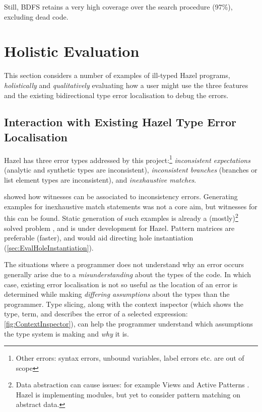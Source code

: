 Still, BDFS retains a very high coverage over the search procedure (97\%), excluding dead code.

\section{Holistic Evaluation}
\label{sec:HolisticEvaluation}

This section considers a number of examples of ill-typed Hazel programs, \textit{holistically} and \textit{qualitatively} evaluating how a user might use the three features and the existing bidirectional type error localisation \cite{MarkedLocalisation} to debug the errors. 


\subsection{Interaction with Existing Hazel Type Error Localisation}
Hazel has three error types addressed by this project:\footnote{Other errors: syntax errors, unbound variables, label errors etc. are out of scope} \textit{inconsistent expectations} (analytic and synthetic types are inconsistent), \textit{inconsistent branches }(branches or list element types are inconsistent), and \textit{inexhaustive matches}. 

 showed how witnesses can be associated to inconsistency errors. Generating examples for inexhaustive match statements was not a core aim, but witnesses for this can be found. Static generation of such examples is already a (mostly)\footnote{Data abstraction can cause issues: for example Views \cite{Views} and Active Patterns {\cite{ActivePatterns}}. Hazel is implementing modules, but yet to consider pattern matching on abstract data.} solved problem \cite{PatternMatchingWarnings}, and is under development for Hazel. Pattern matrices are preferable (faster), and would aid directing hole instantiation (\cref{sec:EvalHoleInstantiation}).

The situations where a programmer does not understand why an error occurs generally arise due to a \textit{misunderstanding} about the types of the code. In which case, existing error localisation is not so useful as the location of an error is determined while making \textit{differing assumptions} about the types than the programmer. Type slicing, along with the context inspector (which shows the type, term, and describes the error of a selected expression: \cref{fig:ContextInspector}), can help the programmer understand which assumptions the type system is making and \textit{why} it is. 

